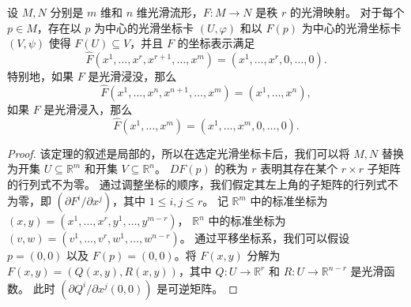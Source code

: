 \documentclass[fontset=none]{Notes}
\begin{document}
\begin{theorem}[秩定理]
  设 $M,N$ 分别是 $m$ 维和 $n$ 维光滑流形，$F:M\to N$ 是秩 $r$ 的光滑映射。
  对于每个 $p\in M$，存在以 $p$ 为中心的光滑坐标卡 $(U,\varphi)$ 和以
  $F(p)$ 为中心的光滑坐标卡 $(V,\psi)$ 使得 $F(U)\subseteq V$，并且
  $F$ 的坐标表示满足
  \[
    \hat F\left(x^1,\dots,x^r,x^{r+1},\dots,x^m\right) =
    \left(x^1,\dots,x^r,0,\dots,0\right).
  \]
  特别地，如果 $F$ 是光滑浸没，那么
  \[
    \hat F\left(x^1,\dots,x^n,x^{n+1},\dots,x^m\right) =
    \left(x^1,\dots,x^n\right),
  \]
  如果 $F$ 是光滑浸入，那么
  \[
    \hat F\left(x^1,\dots,x^m\right) =
    \left(x^1,\dots,x^m,0,\dots,0\right).
  \]
\end{theorem}
\begin{proof}
  该定理的叙述是局部的，所以在选定光滑坐标卡后，我们可以将 $M,N$
  替换为开集 $U\subseteq\mathbb{R}^m$ 和开集 $V\subseteq\mathbb{R}^n$。
  $DF(p)$ 的秩为 $r$ 表明其存在某个 $r\times r$ 子矩阵的行列式不为零。
  通过调整坐标的顺序，我们假定其左上角的子矩阵的行列式不为零，即
  $\left(\partial F^i/\partial x^j\right)$，其中 $1\leq i,j\leq r$。
  记 $\mathbb{R}^m$ 中的标准坐标为 $(x,y)=(x^1,\dots,x^r,y^1,\dots,y^{m-r})$，
  $\mathbb{R}^n$ 中的标准坐标为 $(v,w)=(v^1,\dots,v^r,w^1,\dots,w^{n-r})$。
  通过平移坐标系，我们可以假设 $p=(0,0)$ 以及 $F(p)=(0,0)$。将 
  $F(x,y)$ 分解为 $F(x,y)=\left(Q(x,y),R(x,y)\right)$，其中
  $Q:U\to\mathbb{R}^r$ 和 $R:U\to\mathbb{R}^{n-r}$ 是光滑函数。
  此时 $\left(\partial Q^i/\partial x^j(0,0)\right)$ 是可逆矩阵。


\end{proof}
\end{document}

